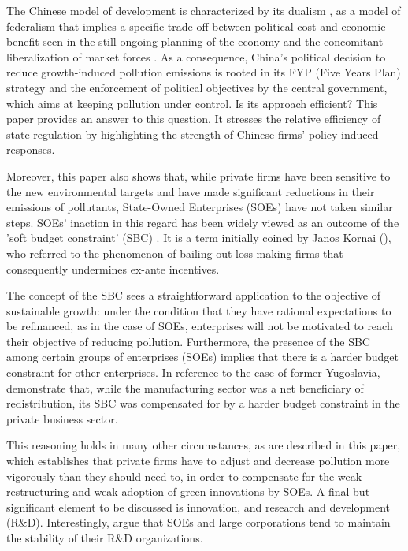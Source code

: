 \documentclass[12pt]{article}
\begin{document}
The Chinese model of development is characterized by its dualism \citep{Vahabi1995-fm}, as a model of federalism that implies a specific trade-off between political cost and economic benefit seen in the still ongoing planning of the economy and the concomitant liberalization of market forces \citep{Berglof1998-oc,Qian1998-yf}. As a consequence, China's political decision to reduce growth-induced pollution emissions is rooted in its FYP (Five Years Plan) strategy and the enforcement of political objectives by the central government, which aims at keeping pollution under control. Is its approach efficient? This paper provides an answer to this question. It stresses the relative efficiency of state regulation by highlighting the strength of Chinese firms' policy-induced responses. 

Moreover, this paper also shows that, while private firms have been sensitive to the new environmental targets and have made significant reductions in their emissions of pollutants, State-Owned Enterprises (SOEs) have not taken similar steps. SOEs' inaction in this regard has been widely viewed as an outcome of the 'soft budget constraint' (SBC) \citep{Kornai2003-nv}. It is a term initially coined by Janos Kornai (\citeyear{Kornai1993-kg, Kornai1995-cu, Kornai1998-ek, Kornai2001-bw}), who referred to the phenomenon of bailing-out loss-making firms that consequently undermines ex-ante incentives.

The concept of the SBC sees a straightforward application to the objective of sustainable growth: under the condition that they have rational expectations to be refinanced, as in the case of SOEs, enterprises will not be motivated to reach their objective of reducing pollution. Furthermore, the presence of the SBC among certain groups of enterprises (SOEs) implies that there is a harder budget constraint for other enterprises. In reference to the case of former Yugoslavia, \cite{Kraft1992-iy} demonstrate that, while the manufacturing sector was a net beneficiary of redistribution, its SBC was compensated for by a harder budget constraint in the private business sector. 

This reasoning holds in many other circumstances, as are described in this paper, which establishes that private firms have to adjust and decrease pollution more vigorously than they should need to, in order to compensate for the weak restructuring and weak adoption of green innovations by SOEs. A final but significant element to be discussed is innovation, and research and development (R\&D). Interestingly, \cite{Huang1998-pi} argue that SOEs and large corporations tend to maintain the stability of their R&D organizations.
\end{document}
